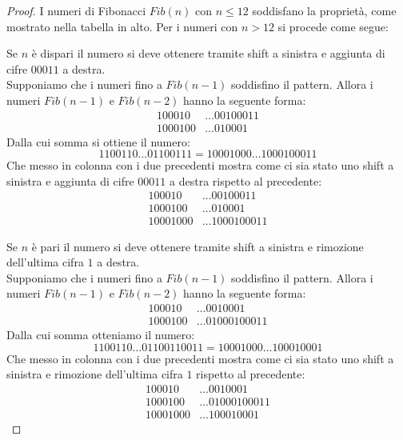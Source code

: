 \documentclass[Lau,oneside]{sapthesis}
\begin{document}
\begin{proof}
I numeri di Fibonacci $Fib(n)$ con $n \leq 12$ soddisfano la proprietà, come mostrato nella tabella in alto. Per i numeri con $n > 12$ si procede come segue:

\medskip

Se $n$ è dispari il numero si deve ottenere tramite shift a sinistra e aggiunta di cifre $00011$ a destra.\\
Supponiamo che i numeri fino a $Fib(n-1)$ soddisfino il pattern. Allora i numeri $Fib(n-1)$ e $Fib(n-2)$ hanno la seguente forma:
\begin{align*}
 100010 & \ldots 00100011 \tag{$n-2$}\\
1000100 & \ldots 010001   \tag{$n-1$}
\end{align*}
Dalla cui somma si ottiene il numero:
$$1100110 \ldots 01100111 = 10001000 \ldots 1000100011$$
Che messo in colonna con i due precedenti mostra come ci sia stato uno shift a sinistra e aggiunta di cifre $00011$ a destra rispetto al precedente:
\begin{align*}
  100010 & \ldots 00100011   \tag{$n-2$}\\
 1000100 & \ldots 010001     \tag{$n-1$}\\
10001000 & \ldots 1000100011 \tag{$n$}
\end{align*}

\vspace{1.5cm}

Se $n$ è pari il numero si deve ottenere tramite shift a sinistra e rimozione dell'ultima cifra $1$ a destra.\\
Supponiamo che i numeri fino a $Fib(n-1)$ soddisfino il pattern. Allora i numeri $Fib(n-1)$ e $Fib(n-2)$ hanno la seguente forma:
\begin{align*}
 100010 & \ldots 0010001     \tag{$n-2$}\\
1000100 & \ldots 01000100011 \tag{$n-1$}
\end{align*}
Dalla cui somma otteniamo il numero:
$$1100110 \ldots 01100110011 = 10001000 \ldots 100010001$$
Che messo in colonna con i due precedenti mostra come ci sia stato uno shift a sinistra e rimozione dell'ultima cifra $1$ rispetto al precedente:
\begin{align*}
  100010 & \ldots 0010001     \tag{$n-2$}\\
 1000100 & \ldots 01000100011 \tag{$n-1$}\\
10001000 & \ldots 100010001   \tag{$n$}
\end{align*}
\end{proof}
\end{document}
